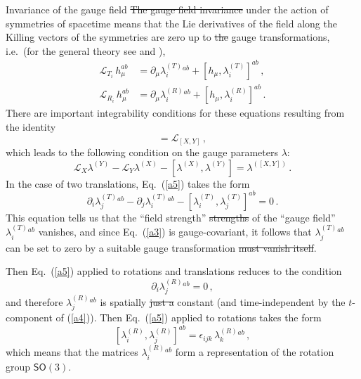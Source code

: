 \documentclass[11pt, a4paper]{article}
\newcommand{\lang}[1]{\textcolor{langfix}{#1}}
\newcommand{\subst}[1]{\textcolor{substantive}{#1}}
\newcommand{\rem}[1]{\textcolor{removeprop}{\sout{#1}}}
\def\SO{\mathsf{SO}}
\begin{document}
\lang{Invariance of the gauge field} \rem{The gauge field invariance} under the action of symmetries of spacetime means that the Lie derivatives of the field along the Killing vectors of the symmetries are zero up to \rem{the} gauge transformations, i.e.\ (for \lang{the} general theory see \cite{Forgacs:1979zs} and \cite{Jackiw:1979ub}),
\begin{align}
\mathcal{L}_{T_i}\,h_\mu^{ab} &= \partial_\mu \lambda^{(T)}_i{}^{ab} + [h_\mu,\lambda^{(T)}_i]^{ab}\,,\label{a3}\\
\mathcal{L}_{R_i}\,h_\mu^{ab} &= \partial_\mu \lambda^{(R)}_i{}^{ab} + [h_\mu,\lambda^{(R)}_i]^{ab}\,.\label{a4}
\end{align}
There are important integrability conditions for these equations resulting from the identity
\begin{equation}
[\mathcal{L}_X, \mathcal{L}_Y] = \mathcal{L}_{[X,Y]}\, ,
\end{equation}
which leads to the following condition on the gauge parameters $\lambda$:
\begin{equation}\label{a5}
\mathcal{L}_X\lambda^{(Y)}-\mathcal{L}_Y\lambda^{(X)} -[\lambda^{(X)},\lambda^{(Y)}] =\lambda^{([X,Y])}\,.
\end{equation}
In the case of two translations, Eq.\ (\ref{a5}) takes the form
\begin{equation}\label{a6}
\partial_i\lambda^{(T)}_j{}^{ab}- \partial_j\lambda^{(T)}_i{}^{ab} - [\lambda^{(T)}_i,\lambda^{(T)}_j]^{ab}=0\, .
\end{equation}
This equation tells \lang{us} that the ``field \lang{strength}'' \rem{strengths} of the ``gauge field'' $\lambda^{(T)}_i{}^{ab}$ vanishes, and since Eq.\ (\ref{a3}) is gauge-covariant, it follows that $\lambda^{(T)}_j{}^{ab}$ \lang{can be set to zero by a suitable gauge transformation} \rem{must vanish itself}.

Then Eq.\ (\ref{a5}) applied to rotations and translations reduces to the condition
\begin{equation}
\partial_i\lambda^{(R)}_j{}^{ab}=0\,,
\end{equation}
and therefore $\lambda^{(R)}_j{}^{ab}$ is \lang{spatially} \rem{just a} constant \subst{(and time-independent by the $t$-component of (\ref{a4}))}. Then Eq.\ (\ref{a5}) applied to rotations takes the form
\begin{equation}\label{a7}
[\lambda^{(R)}_i,\lambda^{(R)}_j]^{ab}=\epsilon_{ijk}\, \lambda^{(R)}_k{}^{ab}\,,
\end{equation}
which means that the matrices $\lambda^{(R)}_i{}^{ab}$ form a representation of the rotation group $\SO(3)$.
\end{document}
